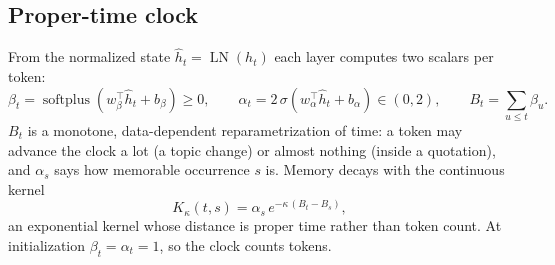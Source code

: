 \documentclass[11pt]{article}
\DeclareMathOperator{\softplus}{softplus}
\DeclareMathOperator{\LN}{LN}
\begin{document}
\subsection{Proper-time clock}
\label{sec:clock}
From the normalized state $\hat h_t=\LN(h_t)$ each layer computes two scalars per token:
\begin{equation}
\beta_t=\softplus(w_\beta^\top\hat h_t+b_\beta)\ge0,\qquad
\alpha_t=2\,\sigma(w_\alpha^\top\hat h_t+b_\alpha)\in(0,2),\qquad
B_t=\sum_{u\le t}\beta_u .
\label{eq:clock}
\end{equation}
$B_t$ is a monotone, data-dependent reparametrization of time: a token may advance the clock a lot (a topic change) or
almost nothing (inside a quotation), and $\alpha_s$ says how memorable occurrence $s$ is. Memory decays with the
continuous kernel
\begin{equation}
K_\kappa(t,s)=\alpha_s\,e^{-\kappa\,(B_t-B_s)},
\label{eq:kernel}
\end{equation}
an exponential kernel whose distance is proper time rather than token count. At initialization $\beta_t=\alpha_t=1$,
so the clock counts tokens.
\end{document}
